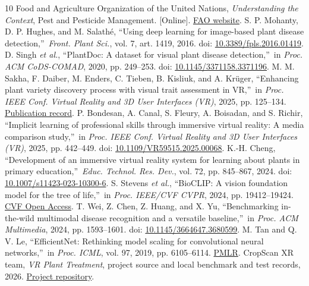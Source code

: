 \documentclass[a4paper,11pt]{article}
\begin{document}
\begingroup\small
\begin{thebibliography}{10}
\setlength{\itemsep}{2pt}
 Food and Agriculture Organization of the United Nations, \emph{Understanding the Context}, Pest and Pesticide Management. [Online]. \href{https://www.fao.org/pest-and-pesticide-management/about/understanding-the-context/en/}{FAO website}.
 S. P. Mohanty, D. P. Hughes, and M. Salath\'e, \textquotedblleft Using deep learning for image-based plant disease detection,\textquotedblright\ \emph{Front. Plant Sci.}, vol. 7, art. 1419, 2016. doi: \href{https://doi.org/10.3389/fpls.2016.01419}{10.3389/fpls.2016.01419}.
 D. Singh \emph{et al.}, \textquotedblleft PlantDoc: A dataset for visual plant disease detection,\textquotedblright\ in \emph{Proc. ACM CoDS-COMAD}, 2020, pp. 249--253. doi: \href{https://doi.org/10.1145/3371158.3371196}{10.1145/3371158.3371196}.
 M. M. Sakha, F. Daiber, M. Enders, C. Tieben, B. Kisliuk, and A. Kr\"uger, \textquotedblleft Enhancing plant variety discovery process with visual trait assessment in VR,\textquotedblright\ in \emph{Proc. IEEE Conf. Virtual Reality and 3D User Interfaces (VR)}, 2025, pp. 125--134. \href{https://www.dfki.de/en/web/research/projects-and-publications/publication/15771}{Publication record}.
 P. Bondesan, A. Canal, S. Fleury, A. Boisadan, and S. Richir, \textquotedblleft Implicit learning of professional skills through immersive virtual reality: A media comparison study,\textquotedblright\ in \emph{Proc. IEEE Conf. Virtual Reality and 3D User Interfaces (VR)}, 2025, pp. 442--449. doi: \href{https://doi.org/10.1109/VR59515.2025.00068}{10.1109/VR59515.2025.00068}.
 K.-H. Cheng, \textquotedblleft Development of an immersive virtual reality system for learning about plants in primary education,\textquotedblright\ \emph{Educ. Technol. Res. Dev.}, vol. 72, pp. 845--867, 2024. doi: \href{https://doi.org/10.1007/s11423-023-10300-6}{10.1007/s11423-023-10300-6}.
 S. Stevens \emph{et al.}, \textquotedblleft BioCLIP: A vision foundation model for the tree of life,\textquotedblright\ in \emph{Proc. IEEE/CVF CVPR}, 2024, pp. 19412--19424. \href{https://openaccess.thecvf.com/content/CVPR2024/html/Stevens_BioCLIP_A_Vision_Foundation_Model_for_the_Tree_of_Life_CVPR_2024_paper.html}{CVF Open Access}.
 T. Wei, Z. Chen, Z. Huang, and X. Yu, \textquotedblleft Benchmarking in-the-wild multimodal disease recognition and a versatile baseline,\textquotedblright\ in \emph{Proc. ACM Multimedia}, 2024, pp. 1593--1601. doi: \href{https://doi.org/10.1145/3664647.3680599}{10.1145/3664647.3680599}.
 M. Tan and Q. V. Le, \textquotedblleft EfficientNet: Rethinking model scaling for convolutional neural networks,\textquotedblright\ in \emph{Proc. ICML}, vol. 97, 2019, pp. 6105--6114. \href{https://proceedings.mlr.press/v97/tan19a.html}{PMLR}.
 CropScan XR team, \emph{VR Plant Treatment}, project source and local benchmark and test records, 2026. \href{https://github.com/bhargavm-iiits/VR-Plant-Treatment}{Project repository}.
\end{thebibliography}
\endgroup
\end{document}
